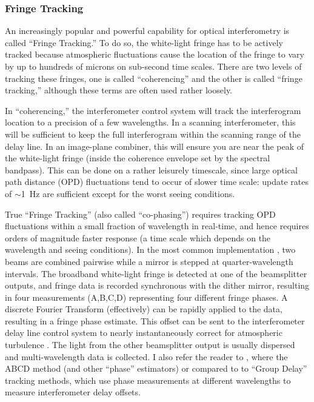 \documentclass[12pt]{article}
\begin{document}
\subsubsection{Fringe Tracking}
An increasingly popular and powerful capability for optical
interferometry is called ``Fringe Tracking.''  To do so, the white-light fringe
has to be actively tracked because atmospheric fluctuations cause the
location of the fringe to vary by up to hundreds of microns on
sub-second time scales.  There are two levels of tracking these
fringes, one is called ``coherencing'' and the other is called
``fringe tracking,'' although these terms are often used rather
loosely.  

In ``coherencing,'' the interferometer control system will track the
interferogram location to a precision of a few wavelengths. In a
scanning interferometer, this will be sufficient to keep the full
interferogram within the scanning range of the delay line.  In an
image-plane combiner, this will ensure you are near the peak of the
white-light fringe (inside the coherence envelope set by the spectral
bandpass).  This can be done on a rather leisurely timescale, since
large optical path distance (OPD) fluctuations tend to occur of slower
time scale: update rates of $\sim$1~Hz are sufficient except for the
worst seeing conditions.

True ``Fringe Tracking'' (also called ``co-phasing'') requires
tracking OPD fluctuations within a small fraction of wavelength in
real-time, and hence requires orders of magnitude faster response (a
time scale which depends on the wavelength and seeing conditions).  In
the most common implementation \citep[the ``ABCD'' method; see][]{shao1977},
two beams are
combined pairwise while a mirror is stepped at quarter-wavelength
intervals.  The broadband white-light fringe is detected at one of the
beamsplitter outputs, and fringe data is recorded synchronous with the
dither mirror, resulting in four measurements (A,B,C,D) representing
four different fringe phases.  A discrete Fourier Transform
(effectively) can be rapidly applied to the data, resulting in a
fringe phase estimate. This offset can be sent to the interferometer
delay line control system to nearly instantaneously correct for
atmospheric turbulence \citep[details in][]{markiii,colavita1999}.
The light from the other beamsplitter output is usually dispersed and
multi-wavelength data is collected.  I also refer the reader to
\citet{lawsonchap2000}, where the ABCD method (and other ``phase''
estimators) or compared to to ``Group Delay'' tracking methods, which
use phase measurements at different wavelengths to measure
interferometer delay offsets.
\end{document}
